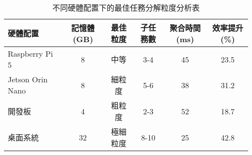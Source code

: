 \begin{table}[h]
\centering
\small
\caption[任務分解粒度分析]{不同硬體配置下的最佳任務分解粒度分析表}
\label{table:task_decomposition}
\begin{tabular}{lccccc}
\toprule[1.1pt]
硬體配置 & 記憶體(GB) & 最佳粒度 & 子任務數 & 聚合時間(ms) & 效率提升(\%)\\
\midrule[1.1pt]
Raspberry Pi 5 & 8 & 中等 & 3-4 & 45 & 23.5\\
\midrule[1.1pt]
Jetson Orin Nano & 8 & 細粒度 & 5-6 & 38 & 31.2\\
\midrule[1.1pt]
開發板 & 4 & 粗粒度 & 2-3 & 52 & 18.7\\
\midrule[1.1pt]
桌面系統 & 32 & 極細粒度 & 8-10 & 25 & 42.8\\
\bottomrule[1.1pt]
\end{tabular}
\end{table} 
